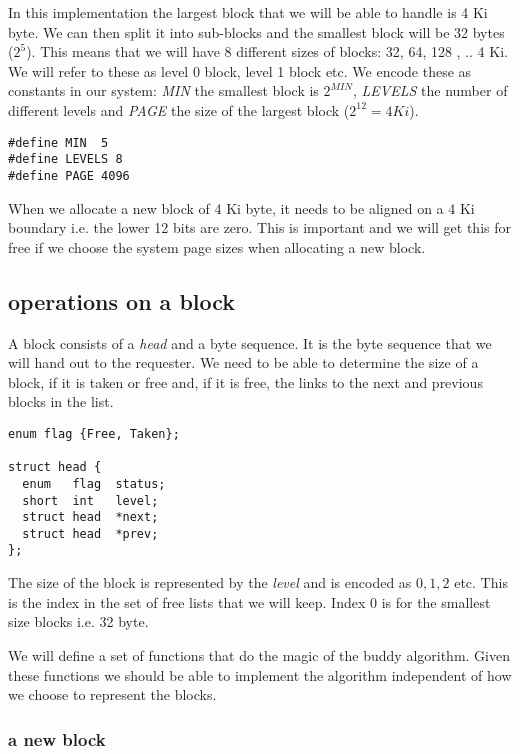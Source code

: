 \documentclass[a4paper,11pt]{article}
\begin{document}
In this implementation the largest block that we will be able to
handle is 4 Ki byte. We can then split it into sub-blocks and the
smallest block will be 32 bytes ($2^5$). This means that we will have
8 different sizes of blocks: 32, 64, 128 , .. 4 Ki. We will refer to
these as level 0 block, level 1 block etc.  We encode these as
constants in our system: {\em MIN} the smallest block is $2^{MIN}$,
{\em LEVELS} the number of different levels and {\em PAGE} the size of
the largest block ($2^{12} = 4 Ki$).

\begin{lstlisting}
#define MIN  5      
#define LEVELS 8
#define PAGE 4096
\end{lstlisting}

When we allocate a new block of 4 Ki byte, it needs to be aligned on a
4 Ki boundary i.e. the lower 12 bits are zero. This is important and
we will get this for free if we choose the system page sizes when
allocating a new block.

\subsection{operations on a block}

A block consists of a {\em head} and a byte sequence. It is the byte
sequence that we will hand out to the requester. We need to be able to
determine the size of a block, if it is taken or free and, if it is
free, the links to the next and previous blocks in the list.


\begin{lstlisting}
enum flag {Free, Taken};

struct head {
  enum   flag  status;
  short  int   level;
  struct head  *next;
  struct head  *prev;  
};
\end{lstlisting}

The size of the block is represented by the {\em level} and is encoded as
$0, 1, 2$ etc. This is the index in the set of free lists that we will
keep. Index $0$ is for the smallest size blocks i.e. 32 byte.

We will define a set of functions that do the magic of the buddy
algorithm. Given these functions we should be able to implement the
algorithm independent of how we choose to represent the blocks.

\subsubsection*{a new block}
\end{document}
